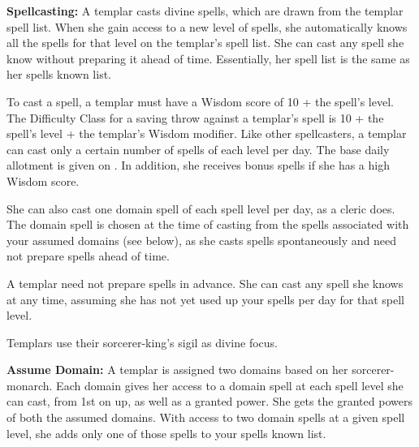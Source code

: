 \textbf{Spellcasting:} A templar casts divine spells, which are drawn from the templar spell list. When she gain access to a new level of spells, she automatically knows all the spells for that level on the templar's spell list. She can cast any spell she know without preparing it ahead of time. Essentially, her spell list is the same as her spells known list.

To cast a spell, a templar must have a Wisdom score of 10 + the spell's level. The Difficulty Class for a saving throw against a templar's spell is 10 + the spell's level + the templar's Wisdom modifier. Like other spellcasters, a templar can cast only a certain number of spells of each level per day. The base daily allotment is given on . In addition, she receives bonus spells if she has a high Wisdom score.

She can also cast one domain spell of each spell level per day, as a cleric does. The domain spell is chosen at the time of casting from the spells associated with your assumed domains (see below), as she casts spells spontaneously and need not prepare spells ahead of time.

A templar need not prepare spells in advance. She can cast any spell she knows at any time, assuming she has not yet used up your spells per day for that spell level.

Templars use their sorcerer-king's sigil as divine focus.

\textbf{Assume Domain:} A templar is assigned two domains based on her sorcerer-monarch. Each domain gives her access to a domain spell at each spell level she can cast, from 1st on up, as well as a granted power. She gets the granted powers of both the assumed domains. With access to two domain spells at a given spell level, she adds only one of those spells to your spells known list.


